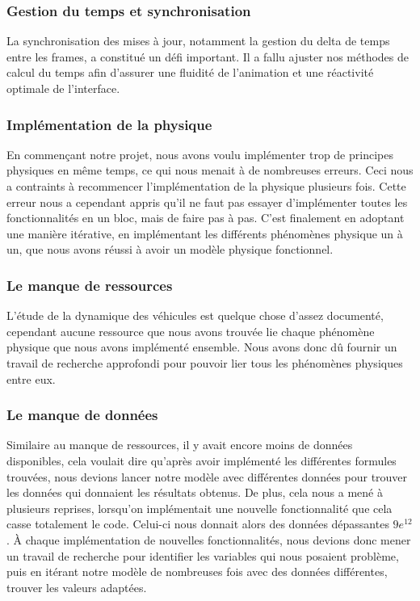 \subsubsection{Gestion du temps et synchronisation}\label{subsubsec:la-gestion-du-temps}
La synchronisation des mises à jour, notamment la gestion du delta de temps entre les frames, a constitué un défi important.
Il a fallu ajuster nos méthodes de calcul du temps afin d’assurer une fluidité de l’animation et une réactivité optimale de l’interface.

\subsubsection{Implémentation de la physique}\label{subsubsec:implem-phys}
En commençant notre projet, nous avons voulu implémenter trop de principes physiques en même temps, ce qui nous menait à de nombreuses erreurs.
Ceci nous a contraints à recommencer l'implémentation de la physique plusieurs fois.
Cette erreur nous a cependant appris qu'il ne faut pas essayer d'implémenter toutes les fonctionnalités en un bloc, mais de faire pas à pas.
C'est finalement en adoptant une manière itérative, en implémentant les différents phénomènes physique un à un, que nous avons réussi à avoir un modèle physique fonctionnel.

\subsubsection{Le manque de ressources}\label{subsubsec:manque-ressources}
L'étude de la dynamique des véhicules est quelque chose d'assez documenté, cependant aucune ressource que nous avons trouvée lie chaque phénomène physique que nous avons implémenté ensemble.
Nous avons donc dû fournir un travail de recherche approfondi pour pouvoir lier tous les phénomènes physiques entre eux.

\subsubsection{Le manque de données}\label{subsubsec:manque-data}
Similaire au manque de ressources, il y avait encore moins de données disponibles, cela voulait dire qu'après avoir implémenté les différentes formules trouvées, nous devions lancer notre modèle avec différentes données pour trouver les données qui donnaient les résultats obtenus.
De plus, cela nous a mené à plusieurs reprises, lorsqu'on implémentait une nouvelle fonctionnalité que cela casse totalement le code.
Celui-ci nous donnait alors des données dépassantes $9e^{12}$.
À chaque implémentation de nouvelles fonctionnalités, nous devions donc mener un travail de recherche pour identifier les variables qui nous posaient problème, puis en itérant notre modèle de nombreuses fois avec des données différentes, trouver les valeurs adaptées.

